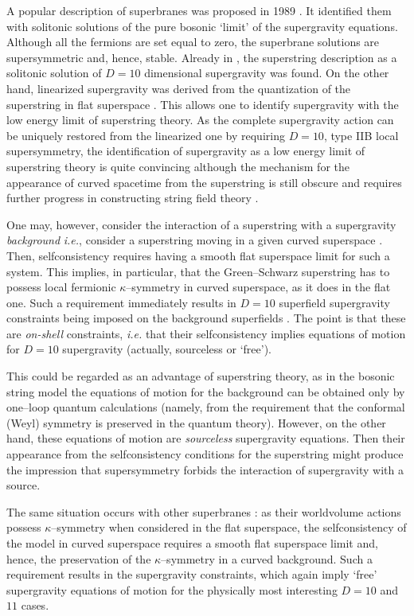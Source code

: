 \documentclass[a4paper,11pt]{article}
\begin{document}
A popular description of superbranes was proposed in 1989 
\cite{DGHR,SUGRA}. It identified them with solitonic 
solutions of the pure bosonic `limit' of the supergravity equations. 
Although all the fermions are set equal to zero, the superbrane solutions are 
supersymmetric and, hence, stable. Already in 
\cite{DGHR}, the superstring description as a solitonic solution of 
$D=10$ dimensional supergravity was found. 
On the other hand, linearized supergravity was derived from the 
quantization of the superstring in flat superspace \cite{GSW}. This allows 
one to 
identify supergravity with the low energy limit of superstring theory. 
As the complete supergravity action 
can be uniquely restored from the linearized one by  
requiring $D=10$, type IIB local supersymmetry, 
the  identification of supergravity as a low energy limit of 
superstring theory is quite convincing although 
the mechanism for the appearance of curved spacetime from the superstring 
is still obscure and requires further progress in constructing string 
field theory \cite{StrF}. 

One may, however, consider the interaction of a superstring with a 
supergravity {\sl background} {\it i.e.}, consider a superstring moving 
in a given curved superspace \cite{strKsg}.  
Then, selfconsistency requires having a smooth flat superspace limit 
for such a system. This implies, in particular, that 
the Green--Schwarz superstring has to  possess local fermionic 
$\kappa$--symmetry \cite{ALS,GSW} in curved superspace, as it does in the flat 
one. Such a requirement immediately results in $D=10$ superfield supergravity 
constraints being imposed on the background superfields \cite{strKsg}. 
The point is that these are {\sl on-shell} constraints, {\it i.e.} 
that their selfconsistency implies equations of motion for 
$D=10$ supergravity (actually, sourceless or `free').  

  
This could be regarded as an advantage of superstring theory, as in the 
bosonic string model the equations of motion for the background can be 
obtained only by one--loop quantum calculations (namely, from the requirement 
that the conformal (Weyl) symmetry is preserved in the quantum theory). 
However, on the other hand, these equations of motion are {\sl sourceless}  
supergravity equations. Then  their appearance from the selfconsistency 
conditions  for the superstring might produce the impression that 
supersymmetry forbids the interaction of supergravity with a source. 

The same situation occurs with other superbranes \cite{BST87,ST90}:  
as their worldvolume actions possess $\kappa$--symmetry when considered 
in the flat superspace, the 
selfconsistency of the model in curved superspace requires a smooth 
flat superspace limit and, hence, the preservation of the 
$\kappa$--symmetry in a curved background. Such a requirement results in 
the supergravity constraints, which again imply `free' supergravity 
equations of motion for 
the physically most interesting $D=10$ and $11$ cases.  
\end{document}

